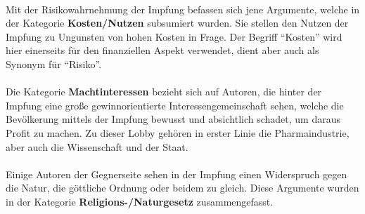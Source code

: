 \documentclass[
    a4paper,
    12pt,
    hyphens,
    chapterprefix=true,
    headheight=33pt,
    footheight=29pt,
    headings=optiontohead, %
]{scrartcl}
\begin{document}
\\
Mit der Risikowahrnehmung der Impfung befassen sich jene Argumente, welche in der Kategorie \textbf{Kosten/Nutzen} subsumiert wurden. Sie stellen den Nutzen der Impfung zu Ungunsten von hohen Kosten in Frage. Der Begriff "`Kosten"' wird hier einerseits für den finanziellen Aspekt verwendet, dient aber auch als Synonym für "`Risiko"'.\\
\\
Die Kategorie \textbf{Machtinteressen} bezieht sich auf Autoren, die hinter der Impfung eine große gewinnorientierte Interessengemeinschaft sehen, welche die Bevölkerung mittels der Impfung bewusst und absichtlich schadet, um daraus Profit zu machen. Zu dieser Lobby gehören in erster Linie die Pharmaindustrie, aber auch die Wissenschaft und der Staat.\\
\\
Einige Autoren der Gegnerseite sehen in der Impfung einen Widerspruch gegen die Natur, die göttliche Ordnung oder beidem zu gleich. Diese Argumente wurden in der Kategorie \textbf{Religions-/Naturgesetz} zusammengefasst.\\
 \\
\end{document}
